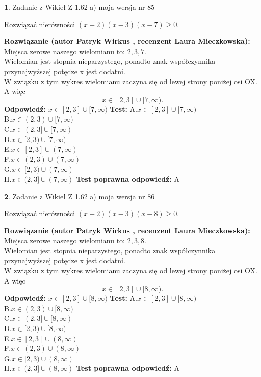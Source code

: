 \documentclass[12pt, a4paper]{article}
\theoremstyle{definition} %
\newtheorem{zad}{}
\newcommand{\zadStart}[1]{\begin{zad}#1\newline}
\newcommand{\zadStop}{\end{zad}}
\newcommand{\rozwStart}[2]{\noindent \textbf{Rozwiązanie (autor #1 , recenzent #2): }\newline}
\newcommand{\rozwStop}{\newline}
\newcommand{\odpStart}{\noindent \textbf{Odpowiedź:}\newline}
\newcommand{\odpStop}{\newline}
\newcommand{\testStart}{\noindent \textbf{Test:}\newline}
\newcommand{\testStop}{\newline}
\newcommand{\kluczStart}{\noindent \textbf{Test poprawna odpowiedź:}\newline}
\newcommand{\kluczStop}{\newline}
\begin{document}
\zadStart{Zadanie z Wikieł Z 1.62 a) moja wersja nr 85}

Rozwiązać nierówności $(x-2)(x-3)(x-7)\ge0$.
\zadStop
\rozwStart{Patryk Wirkus}{Laura Mieczkowska}
Miejsca zerowe naszego wielomianu to: $2, 3, 7$.\\
Wielomian jest stopnia nieparzystego, ponadto znak współczynnika przy\linebreak najwyższej potędze x jest dodatni.\\ W związku z tym wykres wielomianu zaczyna się od lewej strony poniżej osi OX. A więc $$x \in [2,3] \cup [7,\infty).$$
\rozwStop
\odpStart
$x \in [2,3] \cup [7,\infty)$
\odpStop
\testStart
A.$x \in [2,3] \cup [7,\infty)$\\
B.$x \in (2,3) \cup [7,\infty)$\\
C.$x \in (2,3] \cup [7,\infty)$\\
D.$x \in [2,3) \cup [7,\infty)$\\
E.$x \in [2,3] \cup (7,\infty)$\\
F.$x \in (2,3) \cup (7,\infty)$\\
G.$x \in [2,3) \cup (7,\infty)$\\
H.$x \in (2,3] \cup (7,\infty)$
\testStop
\kluczStart
A
\kluczStop



\zadStart{Zadanie z Wikieł Z 1.62 a) moja wersja nr 86}

Rozwiązać nierówności $(x-2)(x-3)(x-8)\ge0$.
\zadStop
\rozwStart{Patryk Wirkus}{Laura Mieczkowska}
Miejsca zerowe naszego wielomianu to: $2, 3, 8$.\\
Wielomian jest stopnia nieparzystego, ponadto znak współczynnika przy\linebreak najwyższej potędze x jest dodatni.\\ W związku z tym wykres wielomianu zaczyna się od lewej strony poniżej osi OX. A więc $$x \in [2,3] \cup [8,\infty).$$
\rozwStop
\odpStart
$x \in [2,3] \cup [8,\infty)$
\odpStop
\testStart
A.$x \in [2,3] \cup [8,\infty)$\\
B.$x \in (2,3) \cup [8,\infty)$\\
C.$x \in (2,3] \cup [8,\infty)$\\
D.$x \in [2,3) \cup [8,\infty)$\\
E.$x \in [2,3] \cup (8,\infty)$\\
F.$x \in (2,3) \cup (8,\infty)$\\
G.$x \in [2,3) \cup (8,\infty)$\\
H.$x \in (2,3] \cup (8,\infty)$
\testStop
\kluczStart
A
\kluczStop
\end{document}
